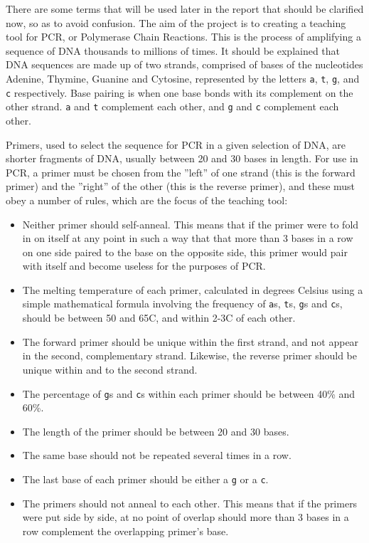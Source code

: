 There are some terms that will be used later in the report that should be clarified now, so as to avoid confusion. The aim of the project is to creating a teaching tool for PCR, or Polymerase Chain Reactions. This is the process of amplifying a sequence of DNA thousands to millions of times. It should be explained that DNA sequences are made up of two strands, comprised of bases of the nucleotides Adenine, Thymine, Guanine and Cytosine, represented by the letters \verb£a£, \verb£t£, \verb£g£, and \verb£c£ respectively. Base pairing is when one base bonds with its complement on the other strand. \verb£a£ and \verb£t£ complement each other, and \verb£g£ and \verb£c£ complement each other.

Primers, used to select the sequence for PCR in a given selection of DNA, are shorter fragments of DNA, usually between 20 and 30 bases in length. For use in PCR, a primer must be chosen from the ''left'' of one strand (this is the forward primer) and the ''right'' of the other (this is the reverse primer), and these must obey a number of rules, which are the focus of the teaching tool:
\begin{itemize}
\item Neither primer should self-anneal. This means that if the primer were to fold in on itself at any point in such a way that that more than 3 bases in a row on one side paired to the base on the opposite side, this primer would pair with itself and become useless for the purposes of PCR.
\item The melting temperature of each primer, calculated in degrees Celsius using a simple mathematical formula involving the frequency of \verb£a£s, \verb£t£s, \verb£g£s and \verb£c£s, should be between 50 and 65\degree C, and within 2-3\degree C of each other.
\item The forward primer should be unique within the first strand, and not appear in the second, complementary strand. Likewise, the reverse primer should be unique within and to the second strand.
\item The percentage of \verb£g£s and \verb£c£s within each primer should be between 40\% and 60\%.
\item The length of the primer should be between 20 and 30 bases.
\item The same base should not be repeated several times in a row.
\item The last base of each primer should be either a \verb£g£ or a \verb£c£.
\item The primers should not anneal to each other. This means that if the primers were put side by side, at no point of overlap should more than 3 bases in a row complement the overlapping primer’s base.
\end{itemize}

